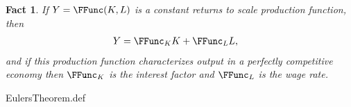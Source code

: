 \documentclass{handout}
\newtheorem{Fact}{Fact}
\begin{document}
\begin{Fact} If $Y=\FFunc(K,L)$ is a constant returns to scale production
function, then
\begin{equation}\begin{gathered}\begin{aligned}
        Y & =  \FFunc_{K} K + \FFunc_{L} L,
\end{aligned}\end{gathered}\end{equation}
and if this production function characterizes output in a perfectly 
competitive economy then $\FFunc_{K}$ is the interest factor and $\FFunc_{L}$ is
the wage rate.

\end{Fact}
\begin{verbatimwrite}{EulersTheorem.def}
\providecommand{\EulersTheorem}{\href{https://www.econ2.jhu.edu/people/ccarroll/public/LectureNotes/MathFacts/MathFactsList\#EulersTheorem}{\ensuremath{\mathtt{[EulersTheorem]}}}}
\end{verbatimwrite}

\end{document}

